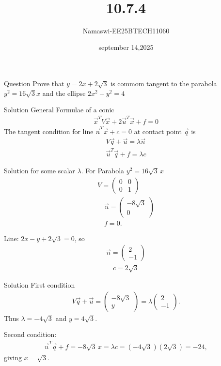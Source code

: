 \documentclass{beamer}
\begin{document}
\title 
{10.7.4}
\date{september 14,2025}


\author 
{Namaswi-EE25BTECH11060}
\frame{\titlepage}
\begin{frame}{Question}
    Prove that $y=2x+2\sqrt{3}$  is commom tangent to the parabola $y^2=16\sqrt{3}x$ and the ellipse $2x^2+y^2=4$
\end{frame}
\begin{frame}{Solution}
    General Formulae of a conic\\
\begin{align}
\vec{x}^T V \vec{x} + 2 \vec{u}^T \vec{x} + f = 0
\end{align}
The tangent condition for line $\vec{n}^T \vec{x} + c = 0$ at contact point $\vec{q}$ is
\begin{align}
V\vec{q} + \vec{u} = \lambda \vec{n}\\ 
\vec{u}^T \vec{q} + f = \lambda c
\end{align}
\end{frame}
\begin{frame}{Solution}
for some scalar $\lambda$.
For Parabola $y^2 = 16\sqrt{3}\,x$
 \begin{align}
V = \begin{pmatrix}0 & 0 \\ 0 & 1\end{pmatrix}\\
\quad 
\vec{u} = \begin{pmatrix}-8\sqrt{3} \\ 0\end{pmatrix}\\
\quad 
f = 0.
\end{align}

Line: $2x - y + 2\sqrt{3} = 0$, so
\begin{align}
\vec{n} = \begin{pmatrix}2 \\ -1\end{pmatrix} \\
\quad c = 2\sqrt{3}
\end{align} 
\end{frame}
\begin{frame}{Solution}
\noindent First condition
\begin{align}
V\vec{q} + \vec{u} = \begin{pmatrix}-8\sqrt{3} \\ y\end{pmatrix} 
= \lambda \begin{pmatrix}2 \\ -1\end{pmatrix}.
\end{align}
Thus $\lambda = -4\sqrt{3}$  and $y = 4\sqrt{3}$.

\noindent Second condition:
\begin{align}
\vec{u}^T \vec{q} + f = -8\sqrt{3}\,x = \lambda c = (-4\sqrt{3})(2\sqrt{3}) = -24,
\end{align}
giving $x = \sqrt{3}$. 
\end{frame}
\end{document}
